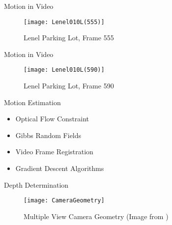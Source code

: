 \documentclass{beamer}
\begin{document}
\begin{frame}[c]{\sc Motion in Video}

\begin{figure}[!h]
\centering
\texttt{[image: Lenel010L(555)]}
\caption{Lenel Parking Lot, Frame 555}
\label{Lenel555s}
\end{figure}

\end{frame}

\begin{frame}[c]{\sc Motion in Video}

\begin{figure}[!h]
\centering
\texttt{[image: Lenel010L(590)]}
\caption{Lenel Parking Lot, Frame 590}
\label{Lenel590}
\end{figure}

\end{frame}


\begin{frame}[c]{\sc Motion Estimation}

\begin{itemize}
\item Optical Flow Constraint
\item Gibbs Random Fields
\item Video Frame Registration
\item Gradient Descent Algorithms
\end{itemize}

\end{frame}






\begin{frame}[t]{\sc Depth Determination}

\begin{figure}[!h]
\centering
\texttt{[image: CameraGeometry]}
\caption{Multiple View Camera Geometry (Image from \cite{Hartley2003})}
\label{CameraGeometry}
\end{figure}

\end{frame}


\end{document}
